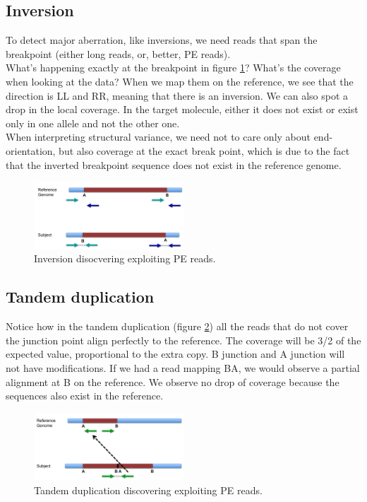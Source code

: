 \subsection{Inversion}
To detect major aberration, like inversions, we need reads that span the breakpoint (either long reads, or, better, PE reads). \\
What's happening exactly at the breakpoint in figure \ref{fig:inversion}? What's the coverage when looking at the data?  When we map them on the reference, we see that the direction is LL and RR, meaning that there is an inversion.
We can also spot a drop in the local coverage.  
In the target molecule, either it does not exist or exist only in one allele and not the other one. \\
When interpreting structural variance, we need not to care only about end-orientation, but also coverage at the exact break point, which is due to the fact that the inverted breakpoint sequence does not exist in the reference genome.


\begin{figure}[htbp!]
    \centering
    \includegraphics[width=0.5\textwidth]{inversion.png}
    \caption{Inversion disocvering exploiting PE reads.}
    \label{fig:inversion}
\end{figure}


\subsection{Tandem duplication}
Notice how in the tandem duplication (figure \ref{fig:tandem}) all the reads that do not cover the junction point align perfectly to the reference.
The coverage will be 3/2 of the expected value, proportional to the extra copy. B junction and A junction will not have modifications. If we had a read mapping BA, we would observe a partial alignment at B on the reference.
We observe no drop of coverage because the sequences also exist in the reference. \\

\begin{figure}[htbp!]
    \centering
    \includegraphics[width=0.5\textwidth]{tandem.png}
    \caption{Tandem duplication discovering exploiting PE reads.}
    \label{fig:tandem}
\end{figure}


